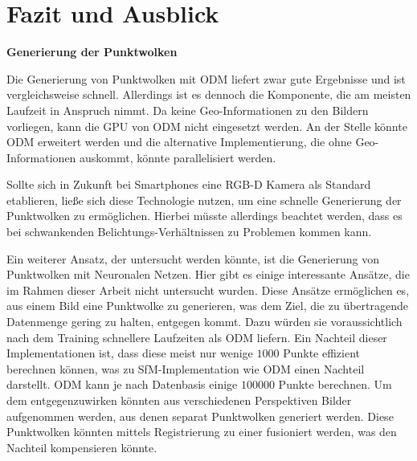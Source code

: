 \documentclass[12pt,titlepage, twoside]{article}
\begin{document}
\newpage
\section{Fazit und Ausblick}
\label{sec:fazit}
%

\textbf{Generierung der Punktwolken}

Die Generierung von Punktwolken mit ODM liefert zwar gute Ergebnisse und ist vergleichsweise schnell. Allerdings ist es dennoch die Komponente, die am meisten Laufzeit in Anspruch nimmt.
Da keine Geo-Informationen zu den Bildern vorliegen, kann die GPU von ODM nicht eingesetzt werden. 
An der Stelle könnte ODM erweitert werden und die alternative Implementierung, die ohne Geo-Informationen auskommt, könnte parallelisiert werden.

Sollte sich in Zukunft bei Smartphones eine RGB-D Kamera als Standard etablieren, ließe sich diese Technologie nutzen, um eine schnelle Generierung der Punktwolken zu ermöglichen.
Hierbei müsste allerdings beachtet werden, dass es bei schwankenden Belichtungs-Verhältnissen zu Problemen kommen kann. 

Ein weiterer Ansatz, der untersucht werden könnte, ist die Generierung von Punktwolken mit Neuronalen Netzen. Hier gibt es einige interessante Ansätze, die im Rahmen dieser Arbeit nicht untersucht wurden. 
Diese Ansätze ermöglichen es, aus einem Bild eine Punktwolke zu generieren, was dem Ziel, die zu übertragende Datenmenge gering zu halten, entgegen kommt. 
Dazu würden sie voraussichtlich nach dem Training schnellere Laufzeiten als ODM liefern.
Ein Nachteil dieser Implementationen ist, dass diese meist nur wenige $1000$ Punkte effizient berechnen können, was zu SfM-Implementation wie ODM einen Nachteil darstellt. 
ODM kann je nach Datenbasis einige $100000$ Punkte berechnen. 
Um dem entgegenzuwirken könnten aus verschiedenen Perspektiven Bilder aufgenommen werden, aus denen separat Punktwolken generiert werden. Diese Punktwolken könnten mittels Registrierung zu einer fusioniert werden, was den Nachteil kompensieren könnte.
\end{document}
